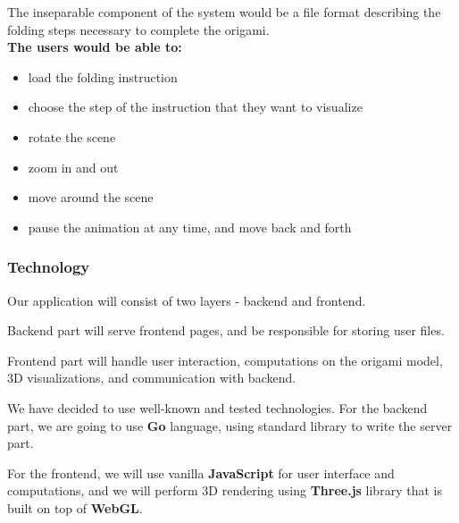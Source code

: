 The inseparable component of the system would be a file format describing the folding steps necessary to complete the origami.\\

\noindent \textbf{The users would be able to:}
\begin{itemize}
	\item load the folding instruction
	\item choose the step of the instruction that they want to visualize
	\item rotate the scene
    \item zoom in and out
	\item move around the scene
	\item pause the animation at any time, and move back and forth
\end{itemize}

\subsubsection{Technology}

Our application will consist of two layers - backend and frontend.

Backend part will serve frontend pages, and be responsible
for storing user files.

Frontend part will handle user interaction, computations on the origami model,
3D visualizations, and communication with backend.

We have decided to use well-known and tested technologies.
For the backend part, we are going to use \textbf{Go} language,
using standard library to write the server part.

For the frontend, we will use vanilla \textbf{JavaScript}
for user interface and computations,
and we will perform 3D rendering using \textbf{Three.js} library
that is built on top of \textbf{WebGL}.

